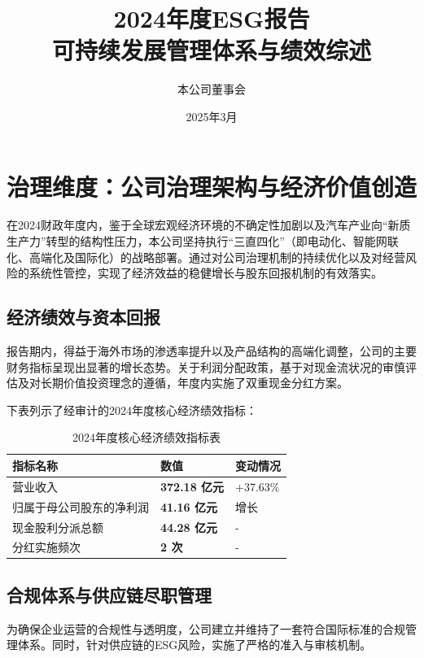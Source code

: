 \documentclass[a4paper,12pt]{article}
\title{\textbf{2024年度ESG报告}\\ \large 可持续发展管理体系与绩效综述}
\author{本公司董事会}
\date{2025年3月}
\begin{document}
\maketitle

\section{治理维度：公司治理架构与经济价值创造}

在2024财政年度内，鉴于全球宏观经济环境的不确定性加剧以及汽车产业向“新质生产力”转型的结构性压力，本公司坚持执行“三直四化”（即电动化、智能网联化、高端化及国际化）的战略部署。通过对公司治理机制的持续优化以及对经营风险的系统性管控，实现了经济效益的稳健增长与股东回报机制的有效落实。

\subsection{经济绩效与资本回报}

报告期内，得益于海外市场的渗透率提升以及产品结构的高端化调整，公司的主要财务指标呈现出显著的增长态势。关于利润分配政策，基于对现金流状况的审慎评估及对长期价值投资理念的遵循，年度内实施了双重现金分红方案。

下表列示了经审计的2024年度核心经济绩效指标：

\begin{table}[h]
\centering
\caption{2024年度核心经济绩效指标表}
\renewcommand{\arraystretch}{1.3}
\begin{tabular}{p{} p{} p{}}
\toprule
\textbf{指标名称} & \textbf{数值} & \textbf{变动情况} \\
\midrule
营业收入 & \textbf{372.18 亿元} & +37.63\% \\
归属于母公司股东的净利润 & \textbf{41.16 亿元} & 增长 \\
现金股利分派总额 & \textbf{44.28 亿元} & - \\
分红实施频次 & \textbf{2 次} & - \\
\bottomrule
\end{tabular}
\end{table}

\subsection{合规体系与供应链尽职管理}

为确保企业运营的合规性与透明度，公司建立并维持了一套符合国际标准的合规管理体系。同时，针对供应链的ESG风险，实施了严格的准入与审核机制。
\end{document}
